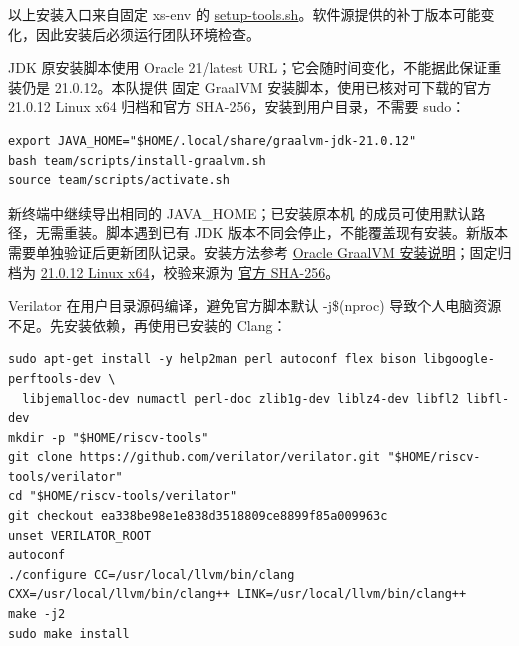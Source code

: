 以上安装入口来自固定 xs-env 的 \href{https://github.com/OpenXiangShan/xs-env/blob/b0b506481e839a5df8a580e76f5aa246dc60fe7c/setup-tools.sh}{setup-tools.sh}。软件源提供的补丁版本可能变化，因此安装后必须运行团队环境检查。\par


JDK 原安装脚本使用 Oracle 21/latest URL；它会随时间变化，不能据此保证重装仍是 21.0.12。本队提供 固定 GraalVM 安装脚本，使用已核对可下载的官方 21.0.12 Linux x64 归档和官方 SHA-256，安装到用户目录，不需要 sudo：\par


\begin{Verbatim}[breaklines,breakanywhere,breaksymbolleft={},breaksymbolright={},fontsize=\footnotesize,baselinestretch=1]
export JAVA_HOME="$HOME/.local/share/graalvm-jdk-21.0.12"
bash team/scripts/install-graalvm.sh
source team/scripts/activate.sh
\end{Verbatim}


新终端中继续导出相同的 JAVA\_HOME；已安装原本机  的成员可使用默认路径，无需重装。脚本遇到已有 JDK 版本不同会停止，不能覆盖现有安装。新版本需要单独验证后更新团队记录。安装方法参考 \href{https://docs.oracle.com/en/graalvm/jdk/21/docs/getting-started/installation-linux/}{Oracle GraalVM 安装说明}；固定归档为 \href{https://download.oracle.com/graalvm/21/archive/graalvm-jdk-21.0.12\_linux-x64\_bin.tar.gz}{21.0.12 Linux x64}，校验来源为 \href{https://download.oracle.com/graalvm/21/archive/graalvm-jdk-21.0.12\_linux-x64\_bin.tar.gz.sha256}{官方 SHA-256}。\par


Verilator 在用户目录源码编译，避免官方脚本默认 -j\$(nproc) 导致个人电脑资源不足。先安装依赖，再使用已安装的 Clang：\par


\begin{Verbatim}[breaklines,breakanywhere,breaksymbolleft={},breaksymbolright={},fontsize=\footnotesize,baselinestretch=1]
sudo apt-get install -y help2man perl autoconf flex bison libgoogle-perftools-dev \
  libjemalloc-dev numactl perl-doc zlib1g-dev liblz4-dev libfl2 libfl-dev
mkdir -p "$HOME/riscv-tools"
git clone https://github.com/verilator/verilator.git "$HOME/riscv-tools/verilator"
cd "$HOME/riscv-tools/verilator"
git checkout ea338be98e1e838d3518809ce8899f85a009963c
unset VERILATOR_ROOT
autoconf
./configure CC=/usr/local/llvm/bin/clang CXX=/usr/local/llvm/bin/clang++ LINK=/usr/local/llvm/bin/clang++
make -j2
sudo make install
\end{Verbatim}


